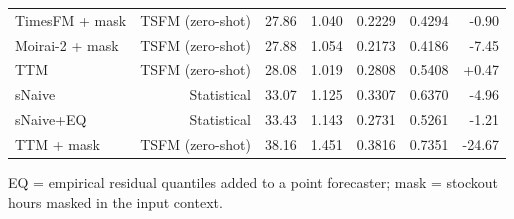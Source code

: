 \begin{table}[t]
\begin{tabular}{lrrrrrr}
TimesFM + mask & TSFM (zero-shot) & 27.86 & 1.040 & 0.2229 & 0.4294 & -0.90 \\
Moirai-2 + mask & TSFM (zero-shot) & 27.88 & 1.054 & 0.2173 & 0.4186 & -7.45 \\
TTM & TSFM (zero-shot) & 28.08 & 1.019 & 0.2808 & 0.5408 & +0.47 \\
sNaive & Statistical & 33.07 & 1.125 & 0.3307 & 0.6370 & -4.96 \\
sNaive+EQ & Statistical & 33.43 & 1.143 & 0.2731 & 0.5261 & -1.21 \\
TTM + mask & TSFM (zero-shot) & 38.16 & 1.451 & 0.3816 & 0.7351 & -24.67 \\
\bottomrule
\end{tabular}
\begin{tablenotes}\footnotesize
\item EQ = empirical residual quantiles added to a point forecaster; mask = stockout hours masked in the input context.
\end{tablenotes}
\end{table}
